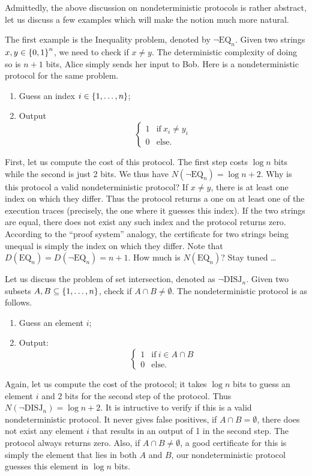 \documentclass[usletter]{article}
\providecommand\cbrac[1]{\ensuremath \left\{#1\right\}}
\newcommand{\nDISJ}{\neg \mathrm{DISJ}}
\newcommand{\EQ}{\mathrm{EQ}}
\newcommand{\nEQ}{\neg \mathrm{EQ}}
\begin{document}
Admittedly, the above discussion on nondeterministic protocols is rather abstract, let us discuss a few examples which will make the notion much more natural.

\begin{example}
The first example is the Inequality problem, denoted by $\nEQ_n$. Given two strings $x, y \in \cbrac{0,1}^n$, we need to check if $x \neq y$. The deterministic complexity of doing so is $n+1$ bits, Alice simply sends her input to Bob. Here is a nondeterministic protocol for the same problem.
\begin{enumerate}
    \item Guess an index $i \in \cbrac{1, \ldots, n}$;
    \item Output
         $$
            \begin{cases}
            1 & \mathrm{if}\ x_i \neq y_i\\
            0 & \mathrm{else.}
            \end{cases}
         $$
\end{enumerate}
First, let us compute the cost of this protocol. The first step costs $\log n$ bits while the second is just 2 bits. We thus have $N(\nEQ_n) = \log n + 2$. Why is this protocol a valid nondeterministic protocol? If $x \neq y$, there is at least one index on which they differ. Thus the protocol returns a one on at least one of the execution traces (precisely, the one where it guesses this index). If the two strings are equal, there does not exist any such index and the protocol returns zero. According to the ``proof system'' analogy, the certificate for two strings being unequal is simply the index on which they differ. Note that $D(\EQ_n) = D(\nEQ_n) = n+1$. How much is $N(\EQ_n)$? Stay tuned \ldots
\end{example}

\begin{example}
Let us discuss the problem of set intersection, denoted as $\nDISJ_n$. Given two subsets $A, B \subseteq \cbrac{1, \ldots, n}$, check if $A \cap B \neq \emptyset$. The nondeterministic protocol is as follows.
\begin{enumerate}
    \item Guess an element $i$;
    \item Output:
         $$
            \begin{cases}
            1 & \mathrm{if}\ i \in A \cap B\\
            0 & \mathrm{else.}
            \end{cases}
         $$
\end{enumerate}
Again, let us compute the cost of the protocol; it takes $\log n$ bits to guess an element $i$ and 2 bits for the second step of the protocol. Thus $N(\nDISJ_n) = \log n + 2$. It is intructive to verify if this is a valid nondeterministic protocol. It never gives false positives, if $A \cap B = \emptyset$, there does not exist any element $i$ that results in an output of 1 in the second step. The protocol always returns zero. Also, if $A \cap B \neq \emptyset$, a good certificate for this is simply the element that lies in both $A$ and $B$, our nondeterministic protocol guesses this element in $\log n$ bits.
\end{example}
\end{document}
